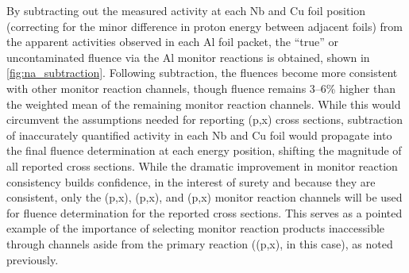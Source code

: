 By subtracting out the measured  activity at each Nb and Cu foil position (correcting for the minor difference in proton energy between adjacent foils) from the apparent   activities observed in each Al foil packet,  the \enquote{true} or uncontaminated fluence via the Al monitor reactions is  obtained, shown  
in \autoref{fig:na_subtraction}.
Following subtraction, the  fluences become more consistent with other monitor reaction channels, 
though   fluence remains 3--6\% higher than the weighted mean of the remaining monitor reaction channels.
While this would circumvent the assumptions needed for reporting (p,x) cross sections, subtraction of  inaccurately quantified  activity in each Nb and Cu foil would propagate into the final fluence determination at each energy position, shifting the magnitude of all reported cross sections.
While the dramatic improvement in monitor reaction consistency builds confidence, in the interest of surety and because they are consistent, only the (p,x), (p,x), and (p,x) monitor reaction channels will be used for fluence determination for the reported cross sections.
This serves as a pointed example of the importance of selecting monitor reaction products inaccessible through channels aside from the primary reaction ((p,x), in this case), as noted previously.




